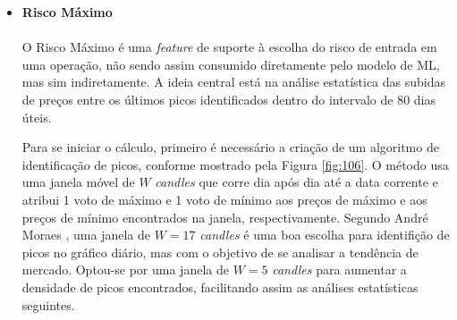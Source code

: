 \begin{itemize}
    As Figuras \ref{fig:400} e \ref{fig:105} e mostram os resultados do algoritmo para dois papéis de comportamentos distintos: MGLU3 representando um companhia com foco em alto crescimento, portanto mais volátil; e ABEV3 representando uma companhia já bem consolidada no mercado, portanto menos volátil.

    \begin{figure}[!htb]
        \texttt{[image: min\_risk\_mglu3.png]}
        \centering
        \caption{MGLU3 - Risco Mínimo (01/01/2019 a 31/12/2019)}
        \label{fig:400}
    \end{figure}

    \begin{figure}[!htb]
        \texttt{[image: min\_risk\_abev3.png]}
        \centering
        \caption{ABEV3 - Risco Mínimo (01/01/2019 a 31/12/2019)}
        \label{fig:105}
    \end{figure}


    \item \textbf{Risco Máximo} \\ \\
    O Risco Máximo é uma \textit{feature} de suporte à escolha do risco de entrada em uma operação, não sendo assim consumido diretamente pelo modelo de ML, mas sim indiretamente. A ideia central está na análise estatística das subidas de preços entre os últimos picos identificados dentro do intervalo de 80 dias úteis.

    Para se iniciar o cálculo, primeiro é necessário a criação de um algoritmo de identificação de picos, conforme mostrado pela Figura \ref{fig:106}. O método usa uma janela móvel de \begin{math} W \end{math} \textit{candles} que corre dia após dia até a data corrente e atribui 1 voto de máximo e 1 voto de mínimo aos preços de máximo e aos preços de mínimo encontrados na janela, respectivamente. Segundo André Moraes \cite{moraes2007se}, uma janela de \begin{math} W = 17 \end{math} \textit{candles} é uma boa escolha para identifição de picos no gráfico diário, mas com o objetivo de se analisar a tendência de mercado. Optou-se por uma janela de \begin{math} W = 5 \end{math} \textit{candles} para aumentar a densidade de picos encontrados, facilitando assim as análises estatísticas seguintes.


\end{itemize}
